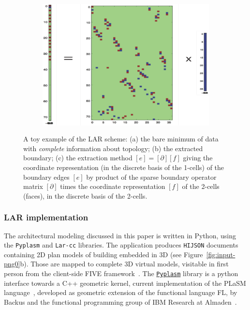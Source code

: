 \documentclass[]{egpubl}
\begin{document}
\begin{figure}[!h]
\begin{subfigure}[b]{0.48\linewidth}
  \caption{}
  \vspace*{4mm}
  \end{subfigure}
 \\
  \begin{subfigure}[b]{0.74\linewidth}
  \centering
  \includegraphics[width=\textwidth]{images/boundary}
  \caption{}
  \end{subfigure}
 
  \caption{A toy example of the LAR scheme: (a) the bare minimum of data with \emph{complete} information about topology; (b) the extracted boundary; (c) the extraction method $[e] = [\partial][f]$ giving the coordinate representation (in the discrete basis of the 1-cells) of the boundary edges $[e]$ by product of the sparse boundary operator matrix $[\partial]$ times the coordinate representation $[f]$ of the 2-cells (faces), in the discrete basis of the 2-cells.}
  \label{fig:minimum-data}
 \end{figure}


\subsubsection*{LAR implementation} 

The architectural modeling discussed in this paper is written in Python, using the \texttt{Pyplasm} and \texttt{Lar-cc} libraries.
The application produces \texttt{HIJSON} documents containing 2D plan models of building embedded in 3D (see Figure~\ref{fig:input-png0}b). Those are mapped to complete  3D virtual models, visitable in first person from the client-side  FIVE framework~\cite{Sportillo:2015,Virgadamo:2015}.
The \href{https://github.com/plasm-language/pyplasm}{\texttt{Pyplasm}}  library is a python interface towards a C++ geometric kernel, current implementation of the  PLaSM language~\cite{Paoluzzi:1995:GPP:212332.212349,Paoluzzi2003a}, developed as geometric extension of the functional language FL, by Backus and the functional programming group of IBM Research at Almaden~\cite{Aiken91thefl,fl-1,backus:78}. 
\end{document}
